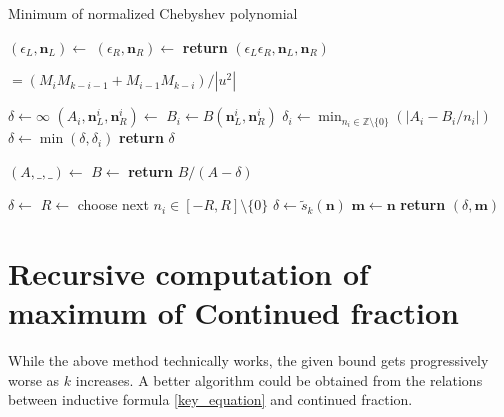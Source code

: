 \documentclass{article}
\theoremstyle{definition}
\theoremstyle{plain}
\theoremstyle{remark}
\numberwithin{equation}{section}
\newcommand{\integer}{\mathbb{Z}}
\newcommand{\abs}[1]{\left\lvert{#1}\right\rvert}
\begin{document}
\begin{algorithm}
  \caption{Minimum of normalized Chebyshev polynomial}
  \begin{algorithmic}
      \State $(\epsilon_L, \mathbf{n}_L) \gets$ 
      \State $(\epsilon_R, \mathbf{n}_R) \gets$ 
      \State \textbf{return} $(\epsilon_L \epsilon_R, \mathbf{n}_L, \mathbf{n}_R)$
    \EndFunction

     $= (M_i M_{k-i-1} + M_{i-1} M_{k-i}) / \abs{u^2}$
    \EndFunction

      \State $\delta \gets \infty$
        \State $(A_i, \mathbf{n}^i_L, \mathbf{n}^i_R) \gets$ 
        \State $B_i \gets B(\mathbf{n}^i_L, \mathbf{n}^i_R)$
        \State $\delta_i \gets \min_{n_i \in \integer \setminus \{0\}} (\abs{A_i - B_i / n_i})$
        \State $\delta \gets \min(\delta, \delta_i)$
      \EndFor
      \State \textbf{return} $\delta$
    \EndFunction

      \State $(A, \_, \_) \gets$ 
      \State $B \gets$ 
      \State \textbf{return} {$B / (A - \delta)$}
    \EndFunction

      \State $\delta \gets$ 
          \State $R \gets$ 
          \State choose next $n_i \in [- R, R] \setminus \{0\}$
        \EndFor
          \State $\delta \gets \tilde{s}_k(\mathbf{n})$
          \State $\mathbf{m} \gets \mathbf{n}$
        \EndIf
      \EndWhile
      \State \textbf{return} $(\delta, \mathbf{m})$
    \EndFunction
  \end{algorithmic}
\end{algorithm}

\section{Recursive computation of maximum of Continued fraction}

While the above method technically works,
the given bound gets progressively worse as $k$ increases.
A better algorithm could be obtained from the relations between
inductive formula \eqref{key_equation} and continued fraction.
\end{document}
